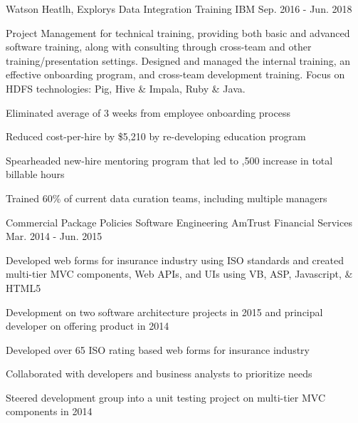 \begin{cventries}
  \cventry
    {Watson Heatlh, Explorys} %
    {Data Integration Training} %
    {IBM} %
    {Sep. 2016 - Jun. 2018} %
    {
      \begin{cvparagraph}
        Project Management for technical training, providing both basic and advanced software training, along with consulting through cross-team and other training/presentation settings.  Designed and managed the internal training, an effective onboarding program, and cross-team development training.  Focus on HDFS technologies: Pig, Hive \& Impala, Ruby \& Java.
      \end{cvparagraph}
      \begin{cvitems} %
        \item {Eliminated average of 3 weeks from employee onboarding process}
        \item {Reduced cost-per-hire by \$5,210 by re-developing education program}
        \item {Spearheaded new-hire mentoring program that led to ,500 increase in total billable hours}
        \item {Trained 60\% of current data curation teams, including multiple managers}
      \end{cvitems}
    }

  \cventry
    {Commercial Package Policies} %
    {Software Engineering} %
    {AmTrust Financial Services} %
    {Mar. 2014 - Jun. 2015} %
    {
      \begin{cvparagraph}
        Developed web forms for insurance industry using ISO standards and created multi-tier MVC components, Web APIs, and UIs using VB, ASP, Javascript, \& HTML5
      \end{cvparagraph}
      \begin{cvitems} %
        \item {Development on two software architecture projects in 2015 and principal developer on offering product in 2014}
        \item {Developed over 65 ISO rating based web forms for insurance industry}
        \item {Collaborated with developers and business analysts to prioritize needs}
        \item {Steered development group into a unit testing project on multi-tier MVC components in 2014}
      \end{cvitems}
    }


\end{cventries}
